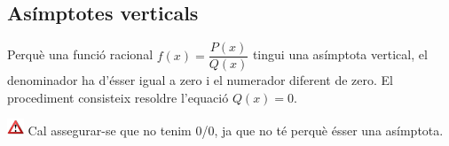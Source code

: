 \subsection{Asímptotes verticals}

 \begin{theorybox}
	
	Perquè una funció racional $f(x)=\dfrac{P(x)}{Q(x)}$ tingui una asímptota vertical, el denominador ha d'ésser igual a zero i el numerador diferent de zero. El procediment consisteix resoldre l'equació \linebreak $Q(x)=0$. 
	
	\begin{flushright}
		\includegraphics[width=0.5cm]{img-06/warning} Cal assegurar-se que no tenim 0/0, ja que no té perquè ésser una asímptota.
	\end{flushright}
	

\end{theorybox}
